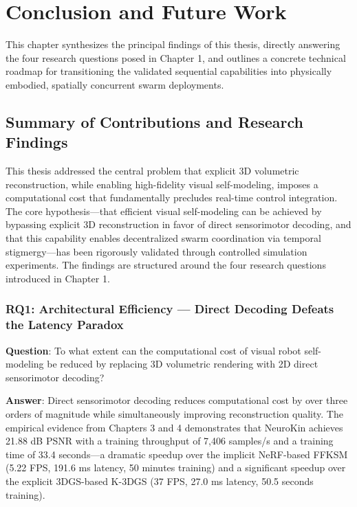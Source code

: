 \documentclass[12pt,a4paper,oneside]{report}
\begin{document}
\clearpage

\chapter{Conclusion and Future Work}
\label{chap:conclusion_future_work}

This chapter synthesizes the principal findings of this thesis, directly answering the four research questions posed in Chapter 1, and outlines a concrete technical roadmap for transitioning the validated sequential capabilities into physically embodied, spatially concurrent swarm deployments.

\section{Summary of Contributions and Research Findings}

This thesis addressed the central problem that explicit 3D volumetric reconstruction, while enabling high-fidelity visual self-modeling, imposes a computational cost that fundamentally precludes real-time control integration. The core hypothesis---that efficient visual self-modeling can be achieved by bypassing explicit 3D reconstruction in favor of direct sensorimotor decoding, and that this capability enables decentralized swarm coordination via temporal stigmergy---has been rigorously validated through controlled simulation experiments. The findings are structured around the four research questions introduced in Chapter 1.

\subsection{RQ1: Architectural Efficiency --- Direct Decoding Defeats the Latency Paradox}

\textbf{Question}: To what extent can the computational cost of visual robot self-modeling be reduced by replacing 3D volumetric rendering with 2D direct sensorimotor decoding?

\textbf{Answer}: Direct sensorimotor decoding reduces computational cost by over three orders of magnitude while simultaneously improving reconstruction quality. The empirical evidence from Chapters 3 and 4 demonstrates that NeuroKin achieves 21.88 dB PSNR with a training throughput of 7,406 samples/s and a training time of 33.4 seconds---a dramatic speedup over the implicit NeRF-based FFKSM (5.22 FPS, 191.6 ms latency, 50 minutes training) and a significant speedup over the explicit 3DGS-based K-3DGS (37 FPS, 27.0 ms latency, 50.5 seconds training).
\end{document}
